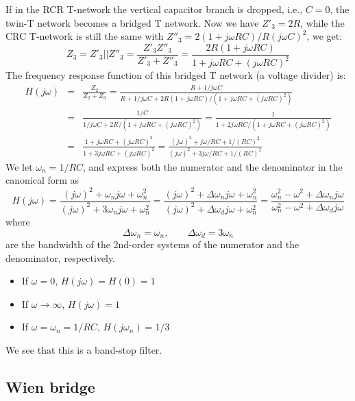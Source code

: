 \documentclass{article}
\begin{document}
If in the RCR T-network the vertical capacitor branch is dropped, 
i.e., $C=0$, the twin-T network becomes a bridged T network. Now
we have $Z'_3=2R$, while the CRC T-network is still the same with 
$Z''_3=2(1+j\omega RC)/R(j\omega C)^2$, we get:
\begin{equation}
  Z_3=Z'_3||Z''_3=\frac{Z'_3 Z''_3}{Z'_3+Z''_3}
  =\frac{2R(1+j\omega RC)}{1+j\omega RC+(j\omega RC)^2}
\end{equation}
The frequency response function of this bridged T network (a voltage 
divider) is:
\begin{eqnarray}
  H(j\omega)&=&\frac{Z_2}{Z_2+Z_3}=\frac{R+1/j\omega C}{R+1/j\omega C+2R(1+j\omega RC)/(1+j\omega RC+(j\omega RC)^2)}
  \nonumber \\
  &=&\frac{1/C}{1/j\omega C+2R/(1+j\omega RC+(j\omega RC)^2)}
  =\frac{1}{1+2j\omega RC/(1+j\omega RC+(j\omega RC)^2)}
  \nonumber \\
  &=&\frac{1+j\omega RC+(j\omega RC)^2}{1+3j\omega RC+(j\omega RC)^2}
  =\frac{(j\omega)^2+j\omega /RC+1/(RC)^2}{(j\omega)^2+3j\omega /RC+1/(RC)^2}
\end{eqnarray}
We let $\omega_n=1/RC$, and express both the numerator and the
denominator in the canonical form as
\begin{equation}
H(j\omega)=\frac{(j\omega)^2+\omega_n j\omega +\omega_n^2}{(j\omega)^2+3\omega_nj\omega +\omega_n^2}
=\frac{(j\omega)^2+\Delta\omega_n j\omega+\omega_n^2}{(j\omega)^2+\Delta\omega_dj\omega +\omega_n^2}
=\frac{\omega_n^2-\omega^2+\Delta\omega_n j\omega }{\omega_n^2-\omega^2+\Delta\omega_dj\omega}
\end{equation}
where 
\begin{equation}
\Delta\omega_n=\omega_n,\;\;\;\;\;\;\;\Delta\omega_d=3\omega_n
\end{equation}
are the bandwidth of the 2nd-order systems of the numerator and the
denominator, respectively. 
\begin{itemize}
\item If $\omega=0$, $H(j\omega)=H(0)=1$
\item If $\omega\rightarrow \infty$, $H(j\omega)=1$
\item If $\omega=\omega_n=1/RC$, $H(j\omega_n)=1/3$
\end{itemize}
We see that this is a band-stop filter.




\subsection*{Wien bridge}
\end{document}
